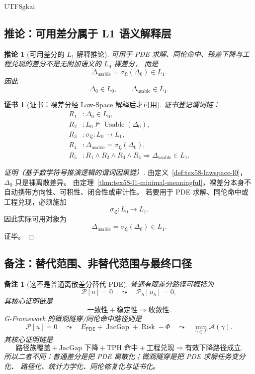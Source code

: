 \documentclass[12pt]{article}
\newtheorem{corollary}{推论}[section]
\newtheorem{remark}{备注}[section]
\newtheorem{Certificate}{证书}[section]
\newcommand{\GFramework}{\textsf{G-Framework}}
\newcommand{\Pcal}{\mathcal P}
\newcommand{\PDE}{\ensuremath{\mathsf{PDE}}}
\DeclareMathOperator{\JacGap}{JacGap}
\DeclareMathOperator{\Risk}{Risk}
\DeclareMathOperator{\Usable}{Usable}
\begin{document}
\begin{CJK*}{UTF8}{gkai}
\subsection{推论：可用差分属于 L1 语义解释层}
\label{subsec:tex58-usable-difference-corollary}

\begin{corollary}[可用差分的 \(L_1\) 解释推论]
\label{cor:tex58-usable-difference-l1}
可用于 PDE 求解、同伦命中、残差下降与工程兑现的差分不是无附加语义的 \(L_0\) 裸差分，
而是
\[
  \Delta_{\mathrm{usable}}
  =
  \sigma_{\mathfrak L}(\Delta_0)
  \in L_1.
\]
因此
\[
  \Delta_0\in L_0,
  \qquad
  \Delta_{\mathrm{usable}}\in L_1.
\]
\end{corollary}

\begin{Certificate}[证书：裸差分经 Law-Space 解释后才可用]
\label{cert:tex58-usable-difference-l1}
证书登记谓词链：
\[
\begin{aligned}
  R_1 &: \Delta_0\in L_0,\\
  R_2 &: L_0\not\models \Usable(\Delta_0),\\
  R_3 &: \sigma_{\mathfrak L}:L_0\to L_1,\\
  R_4 &: \Delta_{\mathrm{usable}}=\sigma_{\mathfrak L}(\Delta_0),\\
  R_5 &: R_1\wedge R_2\wedge R_3\wedge R_4
  \Rightarrow
  \Delta_{\mathrm{usable}}\in L_1.
\end{aligned}
\]
\end{Certificate}

\begin{proof}[证明（基于数学符号推演逻辑的谓词因果链）]
由定义~\ref{def:tex58-lawspace-l0}，\(\Delta_0\) 只是裸离散差异。
由定理~\ref{thm:tex58-l1-minimal-meaningful}，裸差分本身不自动携带方向性、可积性、闭合性或审计性。
若要用于 PDE 求解、同伦命中或工程兑现，必须施加
\[
  \sigma_{\mathfrak L}:L_0\to L_1.
\]
因此实际可用对象为
\[
  \Delta_{\mathrm{usable}}
  =
  \sigma_{\mathfrak L}(\Delta_0)
  \in L_1.
\]
证毕。
\end{proof}

\subsection{备注：替代范围、非替代范围与最终口径}
\label{subsec:tex58-tunnel-substitution-remarks}

\begin{remark}[这不是普通离散差分替代 PDE]
普通有限差分路径可概括为
\[
  \Pcal[u]=0
  \quad\leadsto\quad
  \Pcal_h[u_h]=0,
\]
其核心证明链是
\[
  \text{一致性}+\text{稳定性}\Rightarrow\text{收敛性}.
\]
\GFramework{} 的微观隧穿/同伦命中路径则是
\[
  \Pcal[u]=0
  \quad\leadsto\quad
  E_{\PDE}+\JacGap+\Risk-\Phi
  \quad\leadsto\quad
  \min_{\gamma\in\Gamma}\mathcal A(\gamma).
\]
其核心证明链是
\[
  \text{路径族覆盖}
  +
  \text{JacGap 下降}
  +
  \text{TPH 命中}
  +
  \text{工程兑现}
  \Rightarrow
  \text{有效下降路径成立}.
\]
所以二者不同：普通差分是把 PDE 离散化；微观隧穿是把 PDE 求解任务变分化、
路径化、统计力学化、同伦修复化与证书化。
\end{remark}


\end{CJK*}
\end{document}
